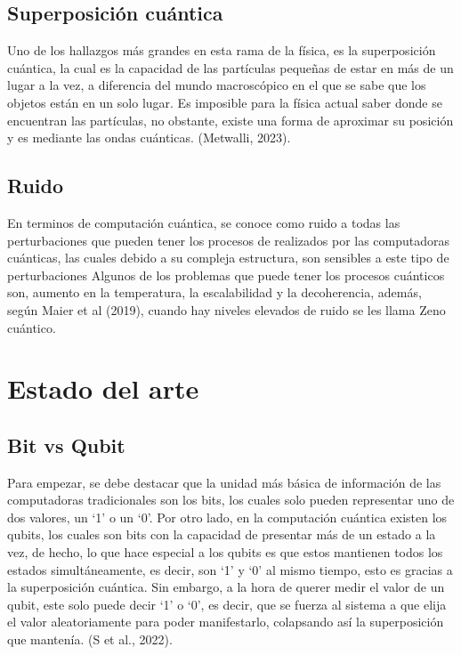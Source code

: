 \documentclass{article}
\begin{document}
\subsection{Superposición cuántica} 
Uno de los hallazgos más grandes en esta rama de la física, es la superposición cuántica, la cual es la capacidad de las partículas pequeñas de estar en más de un lugar a la vez, a diferencia del mundo macroscópico en el que se sabe que los objetos están en un solo lugar. Es imposible para la física actual saber donde se encuentran las partículas, no obstante, existe una forma de aproximar su posición y es mediante las ondas cuánticas. (Metwalli, 2023).

\subsection{Ruido}
En terminos de computación cuántica, se conoce como ruido a todas las perturbaciones que pueden tener los procesos de realizados por las computadoras cuánticas, las cuales debido a su compleja estructura, son sensibles a este tipo de perturbaciones Algunos de los problemas que puede tener los procesos cuánticos son, aumento en la temperatura, la escalabilidad y la decoherencia, además, según Maier et al (2019), cuando hay niveles elevados de ruido se les llama Zeno cuántico. 

\newpage
\section{Estado del arte}

\subsection{Bit vs Qubit}
Para empezar, se debe destacar que la unidad más básica de información de las computadoras tradicionales son los bits, los cuales solo pueden representar uno de dos valores, un ‘1’ o un ‘0’. Por otro lado, en la computación cuántica existen los qubits, los cuales son bits con la capacidad de presentar más de un estado a la vez, de hecho, lo que hace especial a los qubits es que estos mantienen todos los estados simultáneamente, es decir, son ‘1’ y ‘0’ al mismo tiempo, esto es gracias a la superposición cuántica. Sin embargo, a la hora de querer medir el valor de un qubit, este solo puede decir ‘1’ o ‘0’, es decir, que se fuerza al sistema a que elija el valor aleatoriamente para poder manifestarlo, colapsando así la superposición que mantenía. (S et al., 2022).
\end{document}
